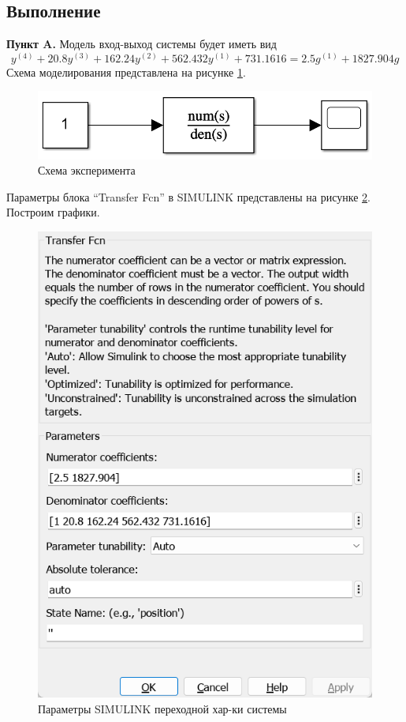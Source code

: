 \documentclass[a4paper, 12pt]{article}
\begin{document}
    \subsection{Выполнение}
    \textbf{Пункт A.} Модель вход-выход системы будет иметь вид
    $$y^{(4)}+20.8y^{(3)}+162.24y^{(2)}+562.432y^{(1)}+731.1616=2.5g^{(1)}+1827.904g$$
    Схема моделирования представлена на рисунке \ref{fig:scheme2}.
    \begin{figure}[H]
        \centering
        \includegraphics[scale=0.6]{scheme2.png}
        \captionsetup{skip=0pt}
        \caption{Схема эксперимента}
        \label{fig:scheme2}
    \end{figure}
    Параметры блока ``Transfer Fcn'' в SIMULINK представлены на рисунке \ref{fig:window2_A}. Построим графики.
    \begin{figure}[H]
        \centering
        \includegraphics[scale=0.5]{scheme2_window_A.png}
        \caption{Параметры SIMULINK переходной хар-ки системы}
        \label{fig:window2_A}
    \end{figure}
\end{document}
